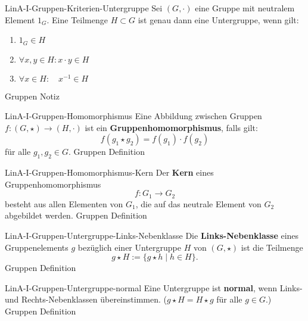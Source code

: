 \documentclass[10pt]{article}
\begin{document}
\begin{note}{LinA-I-Gruppen-Kriterien-Untergruppe}
  \field
  \field
  Sei \((G,\cdot)\) eine Gruppe mit neutralem Element \(1_G\). Eine Teilmenge \(H\subset G\) ist genau dann eine Untergruppe, wenn gilt:
  \begin{center}
    \begin{enumerate}
    \item {}\(1_G \in H\)\clend
    \item {}\(\forall x,y\in H\colon x\cdot y \in H\)\clend
    \item {}\(\forall x\in H\colon \quad x^{-1} \in H\)\clend
    \end{enumerate}
  \end{center}
  \field
  \field Gruppen
  \field Notiz    
\end{note}

\begin{note}{LinA-I-Gruppen-Homomorphismus}
  \field
  \field
  Eine Abbildung zwischen Gruppen \(f\colon (G,\star)\to(H,\cdot)\) ist ein \textbf{Gruppenhomomorphismus}, falls gilt:
  \[
    f(g_1\star g_2) = f(g_1)\cdot f(g_2)
  \]
  für alle \(g_1,g_2 \in G\).
  \clend
  \field
  \field Gruppen
  \field Definition   
\end{note}

\begin{note}{LinA-I-Gruppen-Homomorphismus-Kern}
  \field
  \field
  Der \textbf{Kern} eines Gruppenhomomorphismus \[f\colon G_1\to G_2\] besteht aus allen Elementen von \(G_1\), die auf das neutrale Element von \(G_2\) abgebildet werden.\clend
  \field
  \field Gruppen    
  \field Definition
\end{note}

\begin{note}{LinA-I-Gruppen-Untergruppe-Links-Nebenklasse}
  \field
  \field
  Die \textbf{Links-Nebenklasse} eines Gruppenelements \(g\) bezüglich einer Untergruppe \(H\) von \((G,\star)\) ist die Teilmenge
  \[
    g\star H := \{g\star h \mid h\in H\}.
  \]
  \clend
  \field
  \field Gruppen
  \field Definition    
\end{note}

\begin{note}{LinA-I-Gruppen-Untergruppe-normal}
  \field
  \field
  Eine Untergruppe ist \textbf{normal}, wenn Links- und Rechts-Nebenklassen übereinstimmen.\clend
  \field
  (\(g\star H = H\star g\) für alle \(g\in G\).)
  \field Gruppen
  \field Definition    
\end{note}
\end{document}
